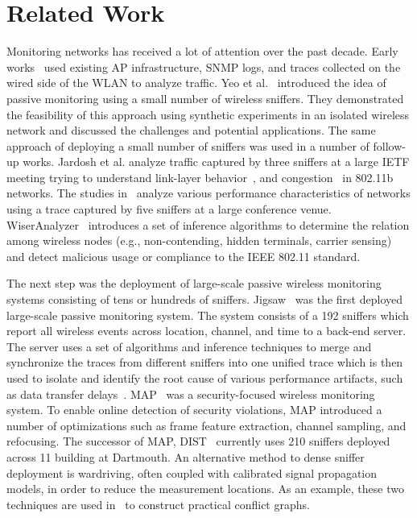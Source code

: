 \section{Related Work}
\label{sec:related}

Monitoring \wifi{} networks has received a lot of attention over the past
decade. Early
works~\cite{balachandran:sigmetrics2002,henderson:mobicom2004,meng:mobicom2004,schwab:infocom2004,chen:mccr2010}
used existing AP infrastructure, SNMP logs, and traces collected on the wired
side of the WLAN to analyze \wifi{} traffic. Yeo et
al.~\cite{yeo:wise2004,yeo:witmemo2005} introduced the idea of passive
monitoring using a small number of wireless sniffers. They demonstrated the
feasibility of this approach using synthetic experiments in an isolated
wireless network and discussed the challenges and potential applications. The
same approach of deploying a small number of sniffers was used in a number of
follow-up works. Jardosh et al. analyze traffic captured by three sniffers at
a large IETF meeting trying to understand link-layer
behavior~\cite{jardosh:wind2005}, and congestion~\cite{jardosh:imc2005} in
802.11b \wifi{} networks. The studies
in~\cite{rodrig:ewind2005,mahajan:sigcomm2006} analyze various performance
characteristics of \wifi{} networks using a trace captured by five sniffers
at a large conference venue. WiserAnalyzer~\cite{chhetri:msn2009} introduces
a set of inference algorithms to determine the relation among wireless nodes
(e.g., non-contending, hidden terminals, carrier sensing) and detect
malicious usage or compliance to the IEEE 802.11 standard.

The next step was the deployment of large-scale passive wireless
monitoring systems consisting of tens or hundreds of sniffers.
Jigsaw~\cite{cheng:sigcomm2006} was the first deployed large-scale
passive monitoring system. The system consists of a 192 sniffers which
report all wireless events across location, channel, and time to a
back-end server. The server uses a set of algorithms and inference
techniques to merge and synchronize the traces from different sniffers
into one unified trace which is then used to isolate and identify the
root cause of various performance artifacts, such as data transfer
delays~\cite{cheng:sigcomm2007}.  MAP~\cite{sheng:wicom2008} was a
security-focused wireless monitoring system.  To enable online
detection of security violations, MAP introduced a number of
optimizations such as frame feature extraction, channel sampling, and
refocusing. The successor of MAP, DIST~\cite{tan:tmc2014} currently
uses 210 sniffers deployed across 11 building at Dartmouth. An
alternative method to dense sniffer deployment is wardriving, often
coupled with calibrated signal propagation models, in order to reduce
the measurement locations. As an example, these two techniques are
used in~\cite{zhou:sigmetrics2013} to construct practical conflict graphs.

